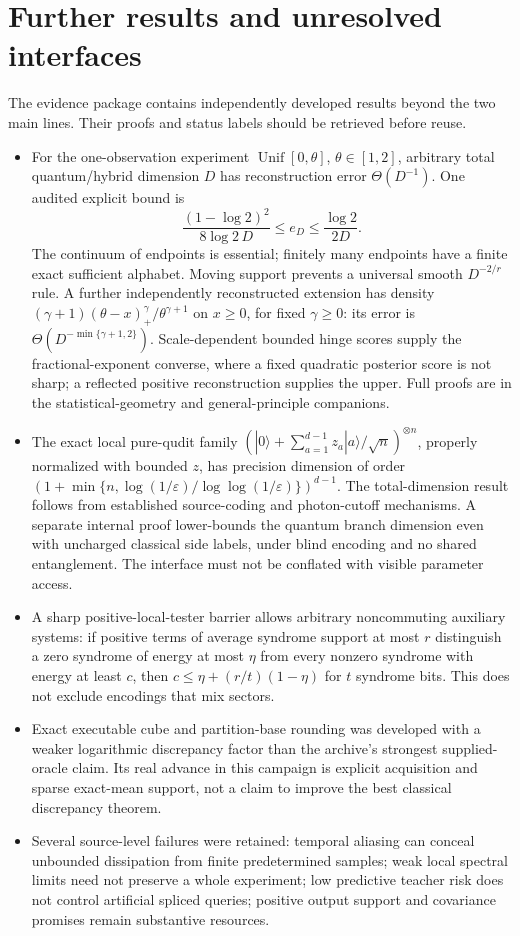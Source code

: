 \documentclass[11pt]{article}
\newcommand{\ket}[1]{|#1\rangle}
\begin{document}
\section{Further results and unresolved interfaces}
The evidence package contains independently developed results beyond the two main lines. Their proofs and status labels should be retrieved before reuse.
\begin{itemize}
\item For the one-observation experiment $\operatorname{Unif}[0,\theta]$, $\theta\in[1,2]$, arbitrary total quantum/hybrid dimension $D$ has reconstruction error $\Theta(D^{-1})$. One audited explicit bound is
\[
 \frac{(1-\log2)^2}{8\log2\,D}\leq e_D\leq\frac{\log2}{2D}.
\]
The continuum of endpoints is essential; finitely many endpoints have a finite exact sufficient alphabet. Moving support prevents a universal smooth $D^{-2/r}$ rule. A further independently reconstructed extension has density $(\gamma+1)(\theta-x)_+^\gamma/\theta^{\gamma+1}$ on $x\geq0$, for fixed $\gamma\geq0$: its error is $\Theta(D^{-\min\{\gamma+1,2\}})$. Scale-dependent bounded hinge scores supply the fractional-exponent converse, where a fixed quadratic posterior score is not sharp; a reflected positive reconstruction supplies the upper. Full proofs are in the statistical-geometry and general-principle companions.
\item The exact local pure-qudit family $(\ket0+\sum_{a=1}^{d-1}z_a\ket a/\sqrt n)^{\otimes n}$, properly normalized with bounded $z$, has precision dimension of order $(1+\min\{n,\log(1/\varepsilon)/\log\log(1/\varepsilon)\})^{d-1}$. The total-dimension result follows from established source-coding and photon-cutoff mechanisms. A separate internal proof lower-bounds the quantum branch dimension even with uncharged classical side labels, under blind encoding and no shared entanglement. The interface must not be conflated with visible parameter access.
\item A sharp positive-local-tester barrier allows arbitrary noncommuting auxiliary systems: if positive terms of average syndrome support at most $r$ distinguish a zero syndrome of energy at most $\eta$ from every nonzero syndrome with energy at least $c$, then $c\leq\eta+(r/t)(1-\eta)$ for $t$ syndrome bits. This does not exclude encodings that mix sectors.
\item Exact executable cube and partition-base rounding was developed with a weaker logarithmic discrepancy factor than the archive's strongest supplied-oracle claim. Its real advance in this campaign is explicit acquisition and sparse exact-mean support, not a claim to improve the best classical discrepancy theorem.
\item Several source-level failures were retained: temporal aliasing can conceal unbounded dissipation from finite predetermined samples; weak local spectral limits need not preserve a whole experiment; low predictive teacher risk does not control artificial spliced queries; positive output support and covariance promises remain substantive resources.
\end{itemize}
\end{document}
